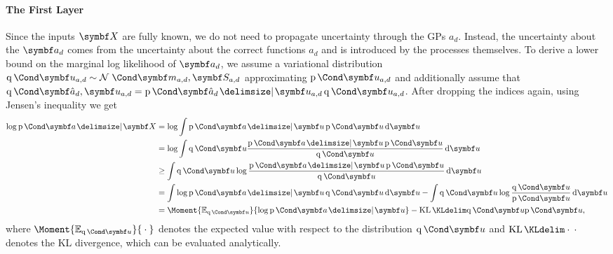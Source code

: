 \paragraph{The First Layer}
\label{sub:timeseries_alignment:first_layer}
Since the inputs $\mat{X}$ are fully known, we do not need to propagate uncertainty through the GPs $a_d$.
Instead, the uncertainty about the $\rv{a_d}$ comes from the uncertainty about the correct functions $a_d$ and is introduced by the processes themselves.
To derive a lower bound on the marginal log likelihood of $\rv{a_d}$, we assume a variational distribution $\Variat{\rv{u_{a, d}}} \sim \Gaussian{\mat{m_{a, d}}, \mat{S_{a, d}}}$ approximating $\Prob{\rv{u_{a, d}}}$ and additionally assume that $\Variat{\rv{\hat{a}_d}, \rv{u_{a, d}}} = \Prob{\rv{\hat{a}_d} \given \rv{u_{a, d}}}\Variat{\rv{u_{a, d}}}$.
After dropping the indices again, using Jensen's inequality we get
\begin{align}
\label{eq:timeseries_alignment:svgp_log_likelihood}
\begin{split}
    \log \Prob{\rv{a} \given \mat{X}} &= \log \int \Prob{\rv{a} \given \rv{u}} \Prob{\rv{u}} \diff \rv{u} \\
    &= \log \int \Variat{\rv{u}} \frac{\Prob{\rv{a} \given \rv{u}} \Prob{\rv{u}}}{\Variat{\rv{u}}} \diff \rv{u} \\
    &\geq \int \Variat{\rv{u}} \log \frac{\Prob{\rv{a} \given \rv{u}} \Prob{\rv{u}}}{\Variat{\rv{u}}} \diff \rv{u} \\
    &= \int \log \Prob{\rv{a} \given \rv{u}} \Variat{\rv{u}} \diff \rv{u} - \int \Variat{\rv{u}} \log \frac{\Variat{\rv{u}}}{\Prob{\rv{u}}} \diff \rv{u} \\
    &= \Moment{\E_{\Variat{\rv{u}}}}{\log \Prob{\rv{a} \given \rv{u}}} - \KL{\Variat{\rv{u}}}{\Prob{\rv{u}}},
\end{split}
\end{align}
where $\Moment{\E_{\Variat{\rv{u}}}}{{}\cdot{}}$ denotes the expected value with respect to the distribution $\Variat{\rv{u}}$ and $\KL{{}\cdot{}}{{}\cdot{}}$ denotes the KL divergence, which can be evaluated analytically.

